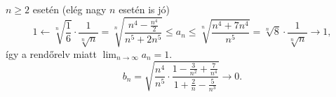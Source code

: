 \documentclass[11pt]{scrartcl}
\begin{document}
$n \ge 2$ esetén (elég nagy $n$ esetén is jó)
\[
	1
	\leftarrow \sqrt[n]{\frac{1}{6}} \cdot \frac{1}{\sqrt[n]{n}}
	= \sqrt[n]{\frac{n^4 - \frac{n^4}{2}}{n^5 + 2n^5}}
	\le a_n
	\le \sqrt[n]{\frac{n^4 + 7n^4}{n^5}}
	= \sqrt[n]{8} \cdot \frac{1}{\sqrt[n]{n}}
	\to 1,
\]
így a rendőrelv miatt $\lim_{n \to \infty} a_n = 1$.
\[
	b_n
	= \sqrt{
		\frac{n^4}{n^5} \cdot
		\frac{1 - \frac{3}{n^2} + \frac{7}{n^4}}{1 + \frac{2}{n} - \frac{5}{n^3}}
	}
	\to 0.
\]
\end{document}
